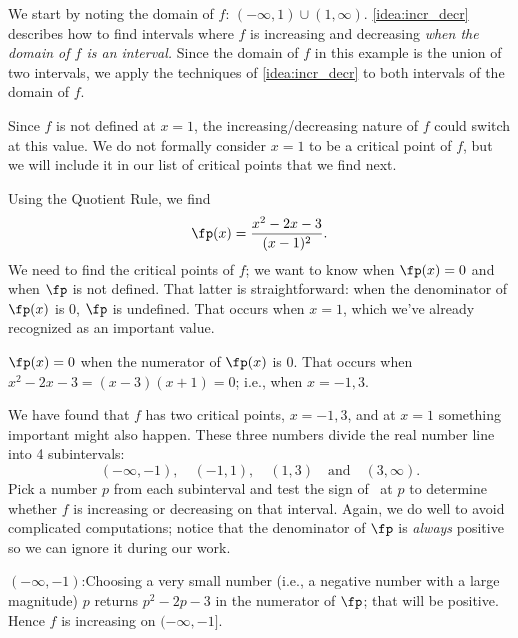 {We start by noting the domain of $f$: $(-\infty,1)\cup(1,\infty)$. \autoref{idea:incr_decr} describes how to find intervals where $f$ is increasing and decreasing \textit{when the domain of $f$ is an interval.} Since the domain of $f$ in this example is the union of two intervals, we apply the techniques of \autoref{idea:incr_decr} to both intervals of the domain of $f$. 

Since $f$ is not defined at $x=1$, the increasing/decreasing nature of $f$ could switch at this value. We do not formally consider $x=1$ to be a critical point of $f$, but we will include it in our list of critical points that we find next.

Using the Quotient Rule, we find
\[\fp(x) = \frac{x^2-2x-3}{(x-1)^2}.\]
We need to find the critical points of $f$; we want to know when $\fp(x)=0$ and when $\fp$ is not defined. That latter is straightforward: when the denominator of $\fp(x)$ is 0, $\fp$ is undefined. That occurs when $x=1$, which we've already recognized as an important value.


$\fp(x)=0$ when the numerator of $\fp(x)$ is 0. That occurs when $x^2-2x-3 = (x-3)(x+1) = 0$; i.e., when $x=-1,3$. 

We have found that $f$ has two critical points, $x=-1,3$, and at $x=1$ something important might also happen. These three numbers divide the real number line into 4 subintervals:
\[(-\infty,-1), \quad (-1, 1), \quad (1,3) \quad \text{and} \quad (3,\infty).\]
Pick a number $p$ from each subinterval and test the sign of \fp\ at $p$ to determine whether $f$ is increasing or decreasing on that interval. Again, we do well to avoid complicated computations; notice that the denominator of $\fp$ is \textit{always} positive so we can ignore it during our work.

\iflatexml\begin{description}\else\begin{description}[leftmargin=0pt]\fi
\item[Interval 1,] $(-\infty,-1)$:\quad  Choosing a very small number (i.e., a negative number with a large magnitude) $p$ returns $p^2-2p-3$ in the numerator of $\fp$; that will be positive. Hence $f$ is increasing on $(-\infty,-1]$.


\end{description}
\end{description}}
